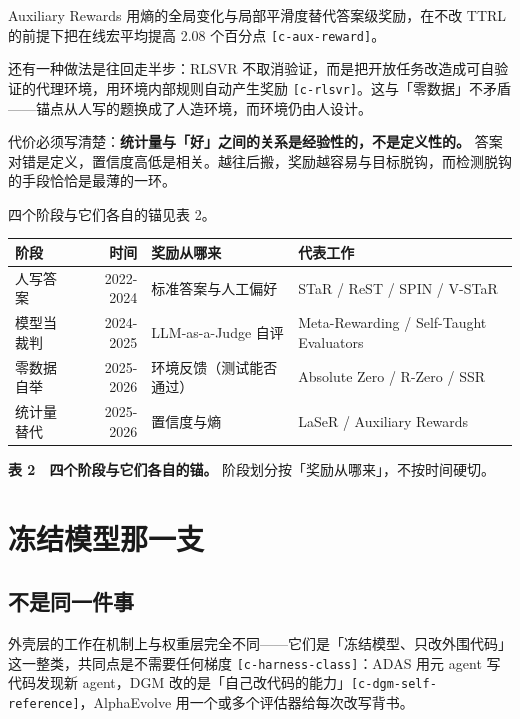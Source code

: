 Auxiliary Rewards 用熵的全局变化与局部平滑度替代答案级奖励，在不改 TTRL 的前提下把在线宏平均提高 2.08 个百分点 {\scriptsize\texttt{[c-\hspace{0pt}aux-\hspace{0pt}reward]}}。


还有一种做法是往回走半步：RLSVR 不取消验证，而是把开放任务改造成可自验证的代理环境，用环境内部规则自动产生奖励 {\scriptsize\texttt{[c-\hspace{0pt}rlsvr]}}。这与「零数据」不矛盾——锚点从人写的题换成了人造环境，而环境仍由人设计。


代价必须写清楚：\textbf{统计量与「好」之间的关系是经验性的，不是定义性的。} 答案对错是定义，置信度高低是相关。越往后搬，奖励越容易与目标脱钩，而检测脱钩的手段恰恰是最薄的一环。


四个阶段与它们各自的锚见表 2。


\begin{table}[t]
\centering
\footnotesize
\setlength{\tabcolsep}{4pt}
\label{tab:2}
\begin{tabularx}{\textwidth}{lrlX}
\toprule
阶段 & 时间 & 奖励从哪来 & 代表工作 \\
\midrule
人写答案 & 2022-2024 & 标准答案与人工偏好 & STaR / ReST / SPIN / V-STaR \\
模型当裁判 & 2024-2025 & LLM-as-a-Judge 自评 & Meta-Rewarding / Self-Taught Evaluators \\
零数据自举 & 2025-2026 & 环境反馈（测试能否通过） & Absolute Zero / R-Zero / SSR \\
统计量替代 & 2025-2026 & 置信度与熵 & LaSeR / Auxiliary Rewards \\
\bottomrule
\end{tabularx}
\end{table}

\textbf{表 2　四个阶段与它们各自的锚。} 阶段划分按「奖励从哪来」，不按时间硬切。


\section{冻结模型那一支}

\subsection{不是同一件事}

外壳层的工作在机制上与权重层完全不同——它们是「冻结模型、只改外围代码」这一整类，共同点是不需要任何梯度 {\scriptsize\texttt{[c-\hspace{0pt}harness-\hspace{0pt}class]}}：ADAS 用元 agent 写代码发现新 agent，DGM 改的是「自己改代码的能力」{\scriptsize\texttt{[c-\hspace{0pt}dgm-\hspace{0pt}self-\hspace{0pt}reference]}}，AlphaEvolve 用一个或多个评估器给每次改写背书。


